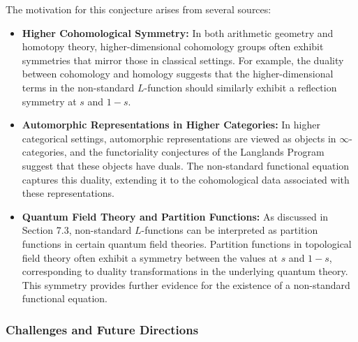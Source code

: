 \documentclass{article}
\theoremstyle{remark}
\begin{document}
The motivation for this conjecture arises from several sources:
\begin{itemize}
    \item \textbf{Higher Cohomological Symmetry:} In both arithmetic geometry and homotopy theory, higher-dimensional cohomology groups often exhibit symmetries that mirror those in classical settings. For example, the duality between cohomology and homology suggests that the higher-dimensional terms in the non-standard $L$-function should similarly exhibit a reflection symmetry at $s$ and $1 - s$.
    \item \textbf{Automorphic Representations in Higher Categories:} In higher categorical settings, automorphic representations are viewed as objects in $\infty$-categories, and the functoriality conjectures of the Langlands Program suggest that these objects have duals. The non-standard functional equation captures this duality, extending it to the cohomological data associated with these representations.
    \item \textbf{Quantum Field Theory and Partition Functions:} As discussed in Section 7.3, non-standard $L$-functions can be interpreted as partition functions in certain quantum field theories. Partition functions in topological field theory often exhibit a symmetry between the values at $s$ and $1 - s$, corresponding to duality transformations in the underlying quantum theory. This symmetry provides further evidence for the existence of a non-standard functional equation.
\end{itemize}

\subsubsection{Challenges and Future Directions}
\end{document}
